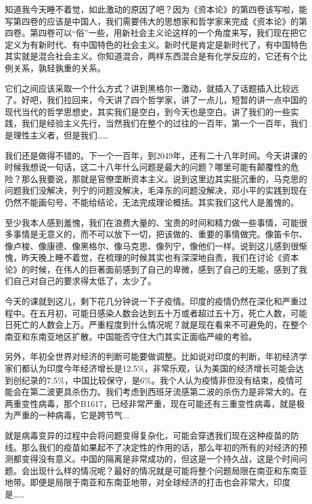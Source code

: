 \documentclass[UTF8, 12pt, a4paper]{ctexrep}
\begin{document}
知道我今天睡不着觉，如此激动的原因了吧？因为《资本论》的第四卷该写啦，能写第四卷的应该是中国人，我们需要伟大的思想家和哲学家来完成《资本论》的第四卷。第四卷可以“俗”一些，用新社会主义论这样的一个角度来写，我们现在把它定义为有新时代、有中国特色的社会主义。新时代是肯定是新时代了，有中国特色其实就是混合社会主义。你知道混合，两样东西混合是有化学反应的，它还有个比例关系，孰轻孰重的关系。

它们之间应该采取一个什么方式？讲到黑格尔一激动，就插入了话题插入比较远了。好吧，我们拉回来，今天讲了四个哲学家，讲了一点儿，短暂的讲一点中国的现代当代的哲学思想史，其实我们是空白，到今天也是空白。讲了我们的一些实践，我们是经验主义先行，当然我们在整个的过往的一百年，第一个一百年，我们是理性主义者，但是我们……

我们还是做得不错的。下一个一百年，到2049年，还有二十八年时间。今天讲课的时候我想说一句话，这二十八年什么问题是最大的问题？哪里可能有颠覆性的危险？那么我要说，那就是官僚垄断资本主义。说到这里边其实挺沉重的，马克思的问题我们没解决，列宁的问题没解决，毛泽东的问题没解决，邓小平的实践到现在仍然不能画句号，不能给结论，无法完成理论概括。其实我们这代人是羞愧的。

至少我本人感到羞愧，我们在浪费大量的、宝贵的时间和精力做一些事情，可能很多事情是无意义的，而不可以放下一切，把该做的、重要的事情做完。像笛卡尔、像卢梭、像康德、像黑格尔、像马克思、像列宁，像他们一样。说到这儿感到很惭愧，昨天晚上睡不着觉，在梳理的时候其实也有深深地自责，我们在讨论《资本论》的时候，在伟人的巨著面前感到了自己的卑微，感到了自己的无能，感到了我们自己对自己的要求得太低了，太少了。

今天的课就到这儿，剩下花几分钟说一下子疫情。印度的疫情仍然在深化和严重过程中。在五月初，可能日感染人数会达到五十万或者超过五十万，死亡人数，可能日死亡的人数会上万。严重程度到什么情况呢？就是现在看来不可避免的，在整个南亚和东南亚地区扩散。中国能否守住大门其实正面临严峻的考验。

另外，年初全世界对经济的判断可能要做调整。比如说对印度的判断，年初经济学家们都认为印度今年经济增长是12.5\%，非常乐观，认为美国的经济增长可能会达到创纪录的7.5\%，中国比较保守，是6\%。我个人认为疫情非但没有结束，疫情可能会在第二波更具杀伤力。我们考虑到西班牙流感第二波的杀伤力是非常大的。在两重变性病毒，那个B1617，已经非常严重，现在可能还有三重变性病毒，就是极为严重的一种病毒，它是跨节气...

就是病毒变异的过程中会将问题变得复杂化，可能会穿透我们现在这种疫苗的防线。那么我们的疫苗如果起不了决定性的作用的话，那么年初的所有的对经济的预测都变得没有意义。中国的隔离是非常成功的，但这是一个持久战，这是个时间问题。会出现什么样的情况呢？最好的情况就是可能将整个问题局限在南亚和东南亚地带。即便是局限于南亚和东南亚地带，对全球经济的打击也会非常大，印度是……
\end{document}
